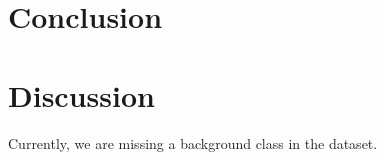 \documentclass[10pt,twocolumn,letterpaper]{article}
\begin{document}
\section{Conclusion}

\section{Discussion}
Currently, we are missing a background class in the dataset.


    {\small
        
        
    }
\end{document}
